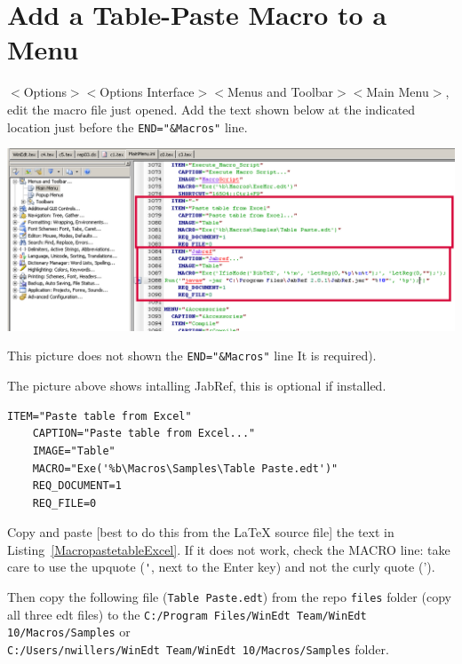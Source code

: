 \section{Add a Table-Paste Macro to a Menu}
\label{sec:addpastetable}

$<$Options$>$$<$Options Interface$>$$<$Menus and Toolbar$>$$<$Main Menu$>$, edit the macro file just opened. Add the text shown below at the indicated location just before the \lstinline{END="&Macros"} line.


\centerline{\includegraphics[bb= 0 0 1055 431,width=\textwidth]{eps/AddExcelTable.png}}

This picture does not shown the \lstinline{END="&Macros"} line It is required).

The picture above shows intalling JabRef, this is optional if installed.

\begin{lstlisting}[label=MacropastetableExcel,caption=Macro to paste table from Excel]
    ITEM="Paste table from Excel"
    CAPTION="Paste table from Excel..."
    IMAGE="Table"
    MACRO="Exe('%b\Macros\Samples\Table Paste.edt')"
    REQ_DOCUMENT=1
    REQ_FILE=0
\end{lstlisting}

Copy and paste [best to do this from the LaTeX source file] the text in Listing~\ref{MacropastetableExcel}. If it does not work,  check the MACRO line:  take care to use the upquote (\verb+'+,  next to the Enter key) and not the curly quote (').

Then copy the following file (\lstinline{Table Paste.edt}) from the repo \lstinline{files} folder  (copy all three edt files)
 to the
\lstinline{C:/Program Files/WinEdt Team/WinEdt 10/Macros/Samples} or\\
\lstinline{C:/Users/nwillers/WinEdt Team/WinEdt 10/Macros/Samples}
folder.

